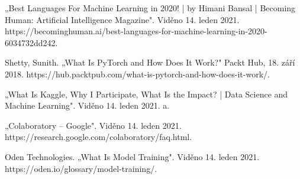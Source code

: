 \documentclass[journal]{IEEEtran}
\begin{document}
\begin{thebibliography}{1}
\bibitem{}
„Best Languages For Machine Learning in 2020! | by Himani Bansal | Becoming Human: Artificial Intelligence Magazine". Viděno 14. leden 2021. https://becominghuman.ai/best-languages-for-machine-learning-in-2020-6034732dd242.


\bibitem{}
Shetty, Sunith. „What Is PyTorch and How Does It Work?" Packt Hub, 18. září 2018. https://hub.packtpub.com/what-is-pytorch-and-how-does-it-work/.

\bibitem{}
„What Is Kaggle, Why I Participate, What Is the Impact? | Data Science and Machine Learning". Viděno 14. leden 2021. a.

\bibitem{}
„Colaboratory – Google". Viděno 14. leden 2021. https://research.google.com/colaboratory/faq.html.

\bibitem{}
Oden Technologies. „What Is Model Training". Viděno 14. leden 2021. https://oden.io/glossary/model-training/.

\end{thebibliography}


% 


\end{document}

